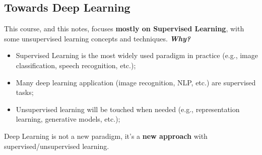 \subsection{Towards Deep Learning}

This course, and this notes, focuses \textbf{mostly on Supervised Learning}, with some unsupervised learning concepts and techniques. \textcolor{Green3}{\textbf{\emph{Why?}}}
\begin{itemize}
    \item Supervised Learning is the most widely used paradigm in practice (e.g., image classification, speech recognition, etc.);
    \item Many deep learning application (image recognition, NLP, etc.) are supervised tasks;
    \item Unsupervised learning will be touched when needed (e.g., representation learning, generative models, etc.);
\end{itemize}
Deep Learning is not a new paradigm, it's a \textbf{new approach} with supervised/unsupervised learning.

